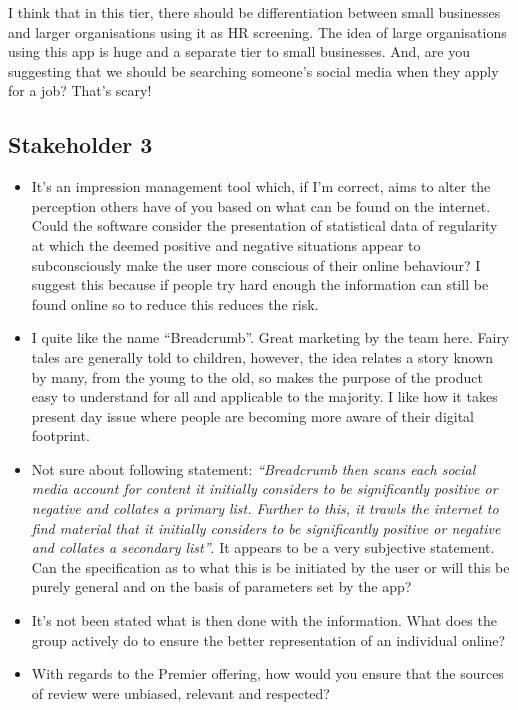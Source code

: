       I think that in this tier, there should be differentiation between small businesses and larger organisations using it as HR screening. The idea of large organisations using this app is huge and a separate tier to small businesses. And, are you suggesting that we should be searching someone's social media when they apply for a job? That's scary!

  \subsection{Stakeholder 3}

    \begin{itemize}
      \item It's an impression management tool which, if I'm correct, aims to alter the perception others have of you based on what can be found on the internet. Could the software consider the presentation of statistical data of regularity at which the deemed positive and negative situations appear to subconsciously make the user more conscious of their online behaviour? I suggest this because if people try hard enough the information can still be found online so to reduce this reduces the risk.
      \item I quite like the name ``Breadcrumb''. Great marketing by the team here. Fairy tales are generally told to children, however, the idea relates a story known by many, from the young to the old, so makes the purpose of the product easy to understand for all and applicable to the majority. I like how it takes present day issue where people are becoming more aware of their digital footprint.
      \item Not sure about following statement: \emph{``Breadcrumb then scans each social media account for content it initially considers to be significantly positive or negative and collates a primary list. Further to this, it trawls the internet to find material that it initially considers to be significantly positive or negative and collates a secondary list''}. It appears to be a very subjective statement. Can the specification as to what this is be initiated by the user or will this be purely general and on the basis of parameters set by the app?
      \item It's not been stated what is then done with the information. What does the group actively do to ensure the better representation of an individual online?
      \item With regards to the Premier offering, how would you ensure that the sources of review were unbiased, relevant and respected?
    \end{itemize}

